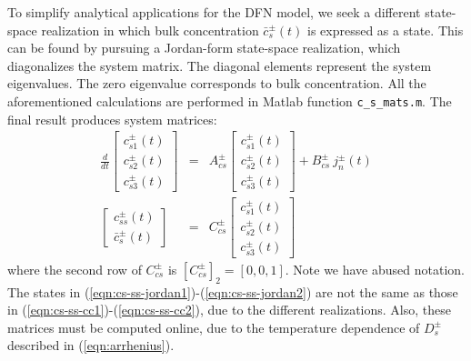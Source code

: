 \documentclass[12pt]{article}
\begin{document}
To simplify analytical applications for the DFN model, we seek a different state-space realization in which bulk concentration $\bar{c}_s^{\pm}(t)$ is expressed as a state. This can be found by pursuing a Jordan-form state-space realization, which diagonalizes the system matrix. The diagonal elements represent the system eigenvalues. The zero eigenvalue corresponds to bulk concentration. All the aforementioned calculations are performed in Matlab function \texttt{c\_s\_mats.m}. The final result produces system matrices:
\begin{eqnarray}
\frac{d}{dt}
\left[
\begin{array}{c}
 c_{s1}^{\pm}(t) \\
 c_{s2}^{\pm}(t) \\
 c_{s3}^{\pm}(t)
\end{array}
\right]
&=&
A_{cs}^{\pm}
\left[
\begin{array}{c}
 c_{s1}^{\pm}(t) \\
 c_{s2}^{\pm}(t) \\
 c_{s3}^{\pm}(t)
\end{array}
\right] + 
B_{cs}^{\pm} \ j_{n}^{\pm}(t) \label{eqn:cs-ss-jordan1} \\
\left[
\begin{array}{c}
 c_{ss}^{\pm}(t) \\
 \bar{c}_s^{\pm}(t)
\end{array}
\right] &=& 
C_{cs}^{\pm}
\left[
\begin{array}{c}
 c_{s1}^{\pm}(t) \\
 c_{s2}^{\pm}(t) \\
 c_{s3}^{\pm}(t)
\end{array}
\right] \label{eqn:cs-ss-jordan2}
\end{eqnarray}
where the second row of $C_{cs}^{\pm}$ is $[C_{cs}^{\pm}]_2 = [0, 0, 1]$. Note we have abused notation. The states in (\ref{eqn:cs-ss-jordan1})-(\ref{eqn:cs-ss-jordan2}) are not the same as those in (\ref{eqn:cs-ss-cc1})-(\ref{eqn:cs-ss-cc2}), due to the different realizations. Also, these matrices must be computed online, due to the temperature dependence of $D_s^{\pm}$ described in (\ref{eqn:arrhenius}).

\end{document}
